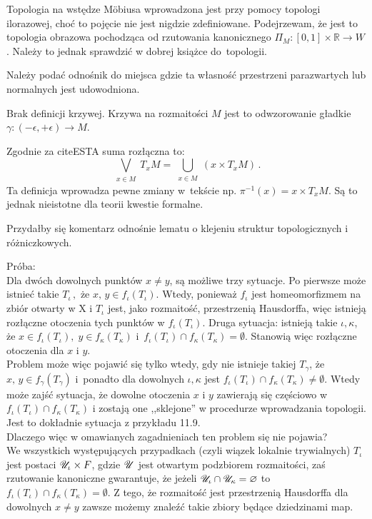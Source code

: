 \documentclass[a4paper,11pt]{article}
\begin{document}
\start {} Topologia na wstędze M\"obiusa wprowadzona jest przy
pomocy topologi ilorazowej, choć to pojęcie nie jest nigdzie
zdefiniowane. Podejrzewam, że jest to topologia obrazowa pochodząca od
rzutowania kanonicznego
$\Pi_{ M } : [ 0,1 ] \times \mathbb{ R } \rightarrow W$. Należy to
jednak sprawdzić w dobrej książce do~topologii.

\start {} Należy podać odnośnik do miejsca gdzie ta własność
przestrzeni parazwartych lub normalnych jest udowodniona.

\start {} Brak definicji krzywej. Krzywa na rozmaitości $M$ jest
to odwzorowanie gładkie
$\gamma : ( - \epsilon, + \epsilon ) \rightarrow M$.

\start {} Zgodnie za cite{ESTA} suma rozłączna to:
\begin{displaymath}
  \bigvee_{ \substack{ x \in M } } T_{ x } M
  = \bigcup_{ \substack{ x \in M } }( x \times T_{ x } M ) \, .
\end{displaymath}
Ta definicja wprowadza pewne zmiany w~tekście np.
$\pi^{ -1 }( x ) = x \times T_{ x }M$. Są to jednak nieistotne dla
teorii kwestie formalne.

\start {} Przydałby się komentarz odnośnie lematu o klejeniu
struktur topologicznych i różniczkowych.

Próba: \\
Dla dwóch dowolnych punktów $x \neq y$, są możliwe trzy sytuacje. Po
pierwsze może istnieć takie $T_{ \iota } \, ,$ że
$x, \, y \in f_{ \iota }( T_{ \iota } )$. Wtedy, ponieważ
$f_{ \iota }$ jest homeomorfizmem na zbiór otwarty w X i $T_{ \iota }$
jest, jako rozmaitość, przestrzenią Hausdorffa, więc istnieją
rozłączne otoczenia tych punktów w $f_{ \iota } ( T_{ \iota } )$.
Druga sytuacja: istnieją takie $\iota, \kappa$, że
$x \in f_{ \iota } ( T_{ \iota } ), \; y \in f_{ \kappa } ( T_{ \kappa
} )$
i~$f_{ \iota } ( T_{ \iota } ) \cap f_{ \kappa } ( T_{ \kappa } ) =
\emptyset$.
Stanowią więc rozłączne otoczenia dla $x$ i $y$. \\
Problem może więc pojawić się tylko wtedy, gdy nie istnieje takiej
$T_{ \gamma }$, że $x, \, y \in f_{ \gamma }( T_{ \gamma } )$
i~ponadto dla dowolnych $\iota, \kappa$ jest
$f_{ \iota } ( T_{ \iota } ) \cap f_{ \kappa } ( T_{ \kappa } ) \neq
\emptyset$. Wtedy może zajść sytuacja, że dowolne otoczenia $x$ i $y$
zawierają się częściowo w
$f_{ \iota } ( T_{ \iota } ) \cap f_{ \kappa } ( T_{ \kappa } )$ i
zostają one ,,sklejone'' w procedurze wprowadzania topologii. Jest to
dokładnie sytuacja z
przykładu 11.9.\\
Dlaczego więc w omawianych zagadnieniach ten problem się nie
pojawia?\\ We wszystkich występujących przypadkach (czyli wiązek
lokalnie trywialnych) $T_{ \iota }$ jest postaci
$\mathcal{ U }_{ \iota } \times F$, gdzie $\mathcal{ U }$ jest otwartym podzbiorem
rozmaitości, zaś rzutowanie kanoniczne gwarantuje, że jeżeli
$\mathcal{ U }_{ \iota } \cap \mathcal{ U }_{ \kappa } = \varnothing$ to
$f_{ \iota } (T_{ \iota }) \cap f_{ \kappa }(T_{ \kappa }) =
\emptyset$. Z tego, że rozmaitość jest przestrzenią Hausdorffa dla
dowolnych $x \neq y$ zawsze możemy znaleźć takie zbiory będące
dziedzinami map.
\end{document}
